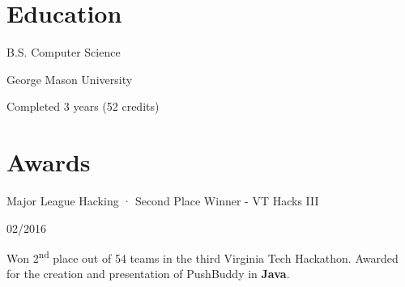 \documentclass[letterpaper]{resume}
\begin{document}
    \section{Education}
    \begin{blockquote}
        B.S. Computer Science\par
        George Mason University\par
        Completed 3 years (52 credits)
    \end{blockquote}
    \sectionrule{}

    \section{Awards}
    \begin{blockquote}
        Major League Hacking · Second Place Winner - VT Hacks III\par
        02/2016\par
        Won 2\textsuperscript{nd} place out of 54 teams in the third Virginia Tech Hackathon. Awarded
        for the creation and presentation of PushBuddy in \textbf{Java}.
    \end{blockquote}
\end{document}
